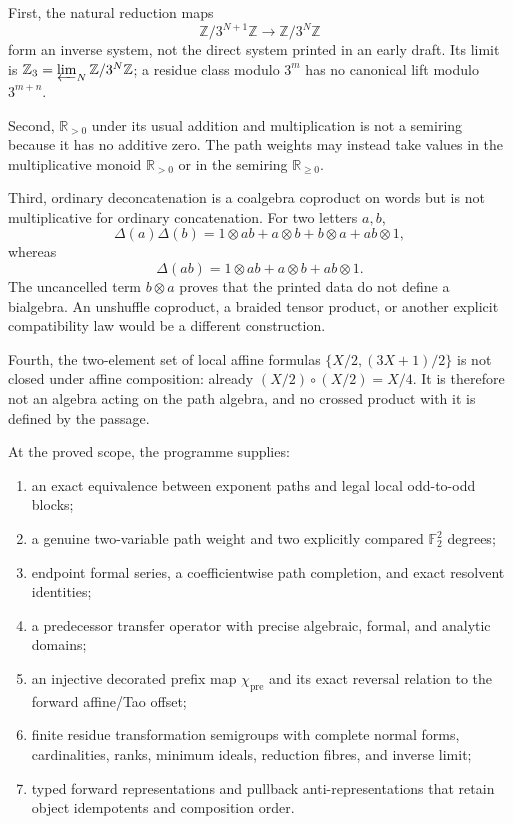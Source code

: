\begin{sourceissue}
\label{sourceissue:weighted-path-four-type-failures}
First, the natural reduction maps
\[
 \mathbb Z/3^{N+1}\mathbb Z\longrightarrow\mathbb Z/3^N\mathbb Z
\]
form an inverse system, not the direct system printed in an early draft.  Its
limit is $\mathbb Z_3=\varprojlim_N\mathbb Z/3^N\mathbb Z$; a residue class
modulo $3^m$ has no canonical lift modulo $3^{m+n}$.

Second, $\mathbb R_{>0}$ under its usual addition and multiplication is not a
semiring because it has no additive zero.  The path weights may instead take
values in the multiplicative monoid $\mathbb R_{>0}$ or in the semiring
$\mathbb R_{\geq0}$.

Third, ordinary deconcatenation is a coalgebra coproduct on words but is not
multiplicative for ordinary concatenation.  For two letters $a,b$,
\[
 \Delta(a)\Delta(b)
 =1\otimes ab+a\otimes b+b\otimes a+ab\otimes1,
\]
whereas
\[
 \Delta(ab)=1\otimes ab+a\otimes b+ab\otimes1.
\]
The uncancelled term $b\otimes a$ proves that the printed data do not define
a bialgebra.  An unshuffle coproduct, a braided tensor product, or another
explicit compatibility law would be a different construction.

Fourth, the two-element set of local affine formulas
$\{X/2,(3X+1)/2\}$ is not closed under affine composition: already
$(X/2)\circ(X/2)=X/4$.  It is therefore not an algebra acting on the path
algebra, and no crossed product with it is defined by the passage.
\end{sourceissue}

At the proved scope, the programme supplies:
\begin{enumerate}[label=\textup{(\arabic*)}]
\item an exact equivalence between exponent paths and legal local
odd-to-odd blocks;
\item a genuine two-variable path weight and two explicitly compared
$\mathbb F_2^2$ degrees;
\item endpoint formal series, a coefficientwise path completion, and exact
resolvent identities;
\item a predecessor transfer operator with precise algebraic, formal, and
analytic domains;
\item an injective decorated prefix map $\chi_{\mathrm{pre}}$ and its exact
reversal relation to the forward affine/Tao offset;
\item finite residue transformation semigroups with complete normal forms,
cardinalities, ranks, minimum ideals, reduction fibres, and inverse limit;
\item typed forward representations and pullback anti-representations that
retain object idempotents and composition order.
\end{enumerate}

